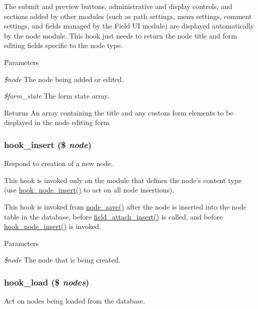 The submit and preview buttons, administrative and display controls, and sections added by other modules (such as path settings, menu settings, comment settings, and fields managed by the Field UI module) are displayed automatically by the node module. This hook just needs to return the node title and form editing fields specific to the node type.


\begin{DoxyParams}{Parameters}
\item[{\em \$node}]The node being added or edited. \item[{\em \$form\_\-state}]The form state array.\end{DoxyParams}
\begin{DoxyReturn}{Returns}
An array containing the title and any custom form elements to be displayed in the node editing form. 
\end{DoxyReturn}
\hypertarget{group__node__api__hooks_ga3c6a28d33e07d3506e1eb99718ef4e39}{
\subsubsection[{hook\_\-insert}]{\setlength{\rightskip}{0pt plus 5cm}hook\_\-insert (\$ {\em node})}}
\label{group__node__api__hooks_ga3c6a28d33e07d3506e1eb99718ef4e39}
Respond to creation of a new node.

This hook is invoked only on the module that defines the node's content type (use \hyperlink{group__node__api__hooks_ga8b40dc62e46e5055c205d2a723dc3548}{hook\_\-node\_\-insert()} to act on all node insertions).

This hook is invoked from \hyperlink{node_8module_a26add7591be64b30a18232927ef14faf}{node\_\-save()} after the node is inserted into the node table in the database, before \hyperlink{group__field__attach_gad7c37d577b97db5e0c182bc570ed7cf4}{field\_\-attach\_\-insert()} is called, and before \hyperlink{group__node__api__hooks_ga8b40dc62e46e5055c205d2a723dc3548}{hook\_\-node\_\-insert()} is invoked.


\begin{DoxyParams}{Parameters}
\item[{\em \$node}]The node that is being created. \end{DoxyParams}
\hypertarget{group__node__api__hooks_ga49065b040d7fb3e02889eda6361dac34}{
\subsubsection[{hook\_\-load}]{\setlength{\rightskip}{0pt plus 5cm}hook\_\-load (\$ {\em nodes})}}
\label{group__node__api__hooks_ga49065b040d7fb3e02889eda6361dac34}
Act on nodes being loaded from the database.

